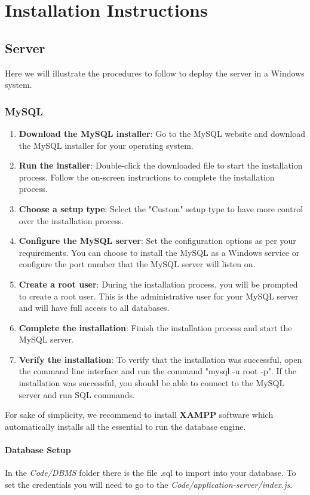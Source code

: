\chapter{Installation Instructions}
\section{Server}
Here we will illustrate the procedures to follow to deploy the server in a Windows system.
\subsection{MySQL}
\begin{enumerate}
    \item \textbf{Download the MySQL installer}: Go to the MySQL website and download the MySQL installer for your operating system.
    \item \textbf{Run the installer}: Double-click the downloaded file to start the installation process. Follow the on-screen instructions to complete the installation process.
    \item \textbf{Choose a setup type}: Select the "Custom" setup type to have more control over the installation process.
    \item \textbf{Configure the MySQL server}: Set the configuration options as per your requirements. You can choose to install the MySQL as a Windows service or configure the port number that the MySQL server will listen on.
    \item \textbf{Create a root user}: During the installation process, you will be prompted to create a root user. This is the administrative user for your MySQL server and will have full access to all databases.
    \item \textbf{Complete the installation}: Finish the installation process and start the MySQL server.
    \item \textbf{Verify the installation}: To verify that the installation was successful, open the command line interface and run the command "mysql -u root -p". If the installation was successful, you should be able to connect to the MySQL server and run SQL commands.
\end{enumerate}
For sake of simplicity, we recommend to install \textbf{XAMPP} software which automatically installs all the essential to run the database engine.
\subsubsection{Database Setup}
In the \emph{Code/DBMS} folder there is the file .sql to import into your database. To set the credentials you will need to go to the \emph{Code/application-server/index.js}.
